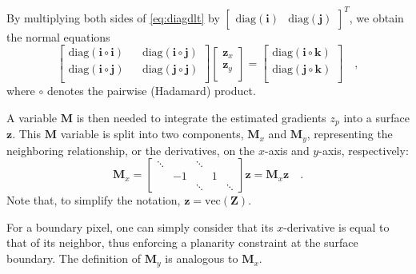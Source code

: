 By multiplying both sides of \eqref{eq:diagdlt} by $\begin{bmatrix}\mathrm{diag}(\mathbf{i}) & \mathrm{diag}(\mathbf{j}) \end{bmatrix}^T$, we obtain the normal equations
\begin{equation}
\begin{bmatrix}
    \mathrm{diag}(\mathbf{i} \circ \mathbf{i}) && \mathrm{diag}(\mathbf{i} \circ \mathbf{j}) \\
    \mathrm{diag}(\mathbf{i} \circ \mathbf{j}) && \mathrm{diag}(\mathbf{j} \circ \mathbf{j}) \\
\end{bmatrix}
\begin{bmatrix}
\mathbf{z}_{x} \\
\mathbf{z}_{y} \\
\end{bmatrix}
=
\begin{bmatrix}
\mathrm{diag}(\mathbf{i} \circ \mathbf{k}) \\
\mathrm{diag}(\mathbf{j} \circ \mathbf{k}) \\
\end{bmatrix} \quad ,
\end{equation}
where $\circ$ denotes the pairwise (Hadamard) product.

A variable $\mathbf{M}$ is then needed to integrate the estimated gradients $z_p$ into a surface $\mathbf{z}$. This $\mathbf{M}$ variable is split into two components, $\mathbf{M}_x$ and $\mathbf{M}_y$, representing the neighboring relationship, or the derivatives, on the $x$-axis and $y$-axis, respectively:
\begin{equation}
\label{eq:M}
\mathbf{M}_x = 
\begin{bmatrix}
\ddots &    & \ddots &   &        \\
       & -1 &        & 1 &        \\
       &    & \ddots &   & \ddots
\end{bmatrix}
\mathbf{z} = \mathbf{M}_x\mathbf{z}  \quad.
\end{equation}
Note that, to simplify the notation, $\mathbf{z} = \mathrm{vec}(\mathbf{Z})$.

For a boundary pixel, one can simply consider that its $x$-derivative is equal to that of its neighbor, thus enforcing a planarity constraint at the surface boundary. The definition of $\mathbf{M}_y$ is analogous to $\mathbf{M}_x$.

